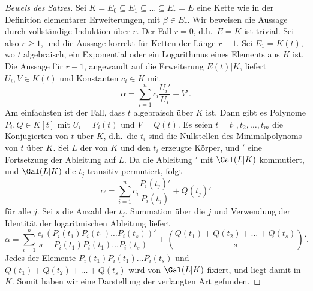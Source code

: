 \documentclass[12pt,a4paper,twoside]{article}
\begin{document}
\begin{proof}[Beweis des Satzes]
  Sei $K=E_0\subseteq E_1\subseteq\dots\subseteq E_r=E$ eine Kette wie in der
  Definition elementarer Erweiterungen, mit $\beta\in E_r$. Wir beweisen die
  Aussage durch vollst\"andige Induktion \"uber $r$. Der Fall $r=0$, d.h.\
  $E=K$ ist trivial. Sei also $r\ge1$, und die Aussage korrekt f\"ur Ketten
  der L\"ange $r-1$. Sei $E_1=K(t)$, wo $t$ algebraisch, ein Exponential oder
  ein Logarithmus eines Elements aus $K$ ist. Die Aussage f\"ur $r-1$,
  angewandt auf die Erweiterung $E(t)|K$, liefert $U_i,V\in K(t)$ und
  Konstanten $c_i\in K$ mit
\[
\alpha=\sum_{i=1}^nc_i\frac{U_i'}{U_i}+V'.
\]
Am einfachsten ist der Fall, dass $t$ algebraisch \"uber $K$ ist. Dann gibt es
Polynome $P_i,Q\in K[t]$ mit $U_i=P_i(t)$ und $V=Q(t)$. Es seien
$t=t_1,t_2,\dots,t_m$ die Konjugierten von $t$ \"uber $K$, d.h.\ die $t_i$
sind die Nullstellen des Minimalpolynoms von $t$ \"uber $K$. Sei $L$ der von
$K$ und den $t_i$ erzeugte K\"orper, und $'$ eine Fortsetzung der Ableitung
auf $L$. Da die Ableitung $'$ mit $\Gal(L|K)$ kommutiert, und $\Gal(L|K)$ die
$t_j$ transitiv permutiert, folgt
\[
\alpha=\sum_{i=1}^nc_i\frac{P_i(t_j)'}{P_i(t_j)}+Q(t_j)'
\]
f\"ur alle $j$. Sei $s$ die Anzahl der $t_j$. Summation \"uber die $j$ und
Verwendung der Identit\"at der logaritmischen Ableitung liefert
\[
\alpha=\sum_{i=1}^n\frac{c_i}{s}\frac{(P_i(t_1)P_i(t_1)\dots P_i(t_s))'}
{P_i(t_1)P_i(t_1)\dots P_i(t_s)}+(\frac{Q(t_1)+Q(t_2)+\dots+Q(t_s)}{s})'.
\]
Jedes der Elemente $P_i(t_1)P_i(t_1)\dots P_i(t_s)$ und
$Q(t_1)+Q(t_2)+\dots+Q(t_s)$ wird von $\Gal(L|K)$ fixiert, und liegt damit in
$K$. Somit haben wir eine Darstellung der verlangten Art gefunden.


\end{proof}
\end{document}
